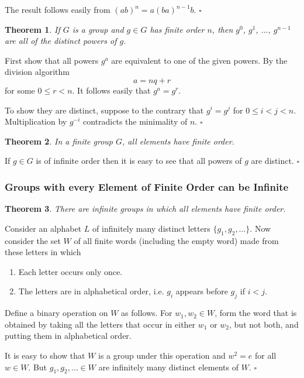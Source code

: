 \documentclass[10pt]{article}
\newtheorem{theorem}{Theorem}[section]
\newenvironment{proof}[1][Proof]{\begin{trivlist}
\item[\hskip \labelsep {\itshape #1}]}{\end{trivlist}}
\begin{document}
\begin{proof}
The result follows easily from $(ab)^n = a(ba)^{n-1}b$. $\square$
\end{proof}

\begin{theorem}
If $G$ is a group and $g \in G$ has finite order $n$, then $g^0$, $g^1$, $\ldots$, $g^{n - 1}$ are all of the distinct powers of $g$.
\end{theorem}

\begin{proof}
First show that all powers $g^a$ are equivalent to one of the given powers. By the division algorithm
$$a = nq + r$$
for some $0 \leq r < n$. It follows easily that $g^a = g^r.$

To show they are distinct, suppose to the contrary that $g^i = g^j$ for $0\leq i < j < n$. Multiplication by $g^{-i}$ contradicts the minimality of $n$. $\square$
\end{proof}

\begin{theorem}
In a finite group $G$, all elements have finite order.
\end{theorem}

\begin{proof}
If $g \in G$ is of infinite order then it is easy to see that all powers of $g$ are distinct. $\square$
\end{proof}

\subsubsection{Groups with every Element of Finite Order can be Infinite}

\begin{theorem}
There are infinite groups in which all elements have finite order.
\end{theorem}

\begin{proof}
Consider an alphabet $L$ of infinitely many distinct letters $\{g_1, g_2, \ldots\}$. Now consider the set $W$ of all finite words (including the empty word) made from these letters in which
\begin{enumerate}
\item Each letter occurs only once.
\item The letters are in alphabetical order, i.e. $g_i$ appears before $g_j$ if $i < j$.
\end{enumerate}

Define a binary operation on $W$ as follows. For $w_1, w_2 \in W$, form the word that is obtained by taking all the letters that occur in either $w_1$ or $w_2$, but not both, and putting them in alphabetical order.

It is easy to show that $W$ is a group under this operation and $w^2 = e$ for all $w \in W$. But $g_1, g_2, \ldots \in W$ are infinitely many distinct elements of $W$. $\square$
\end{proof}
\end{document}
